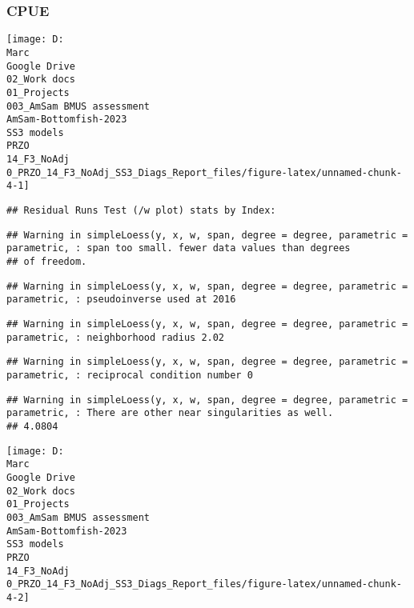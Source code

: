 \documentclass[
]{article}
\begin{document}
\hypertarget{cpue}{%
\subsubsection{CPUE}\label{cpue}}

\begin{center}\texttt{[image: D:\\Marc\\Google Drive\\02\_Work docs\\01\_Projects\\003\_AmSam BMUS assessment\\AmSam-Bottomfish-2023\\SS3 models\\PRZO\\14\_F3\_NoAdj\\0\_PRZO\_14\_F3\_NoAdj\_SS3\_Diags\_Report\_files/figure-latex/unnamed-chunk-4-1]} \end{center}

\begin{verbatim}
## Residual Runs Test (/w plot) stats by Index:
\end{verbatim}

\begin{verbatim}
## Warning in simpleLoess(y, x, w, span, degree = degree, parametric = parametric, : span too small. fewer data values than degrees
## of freedom.
\end{verbatim}

\begin{verbatim}
## Warning in simpleLoess(y, x, w, span, degree = degree, parametric = parametric, : pseudoinverse used at 2016
\end{verbatim}

\begin{verbatim}
## Warning in simpleLoess(y, x, w, span, degree = degree, parametric = parametric, : neighborhood radius 2.02
\end{verbatim}

\begin{verbatim}
## Warning in simpleLoess(y, x, w, span, degree = degree, parametric = parametric, : reciprocal condition number 0
\end{verbatim}

\begin{verbatim}
## Warning in simpleLoess(y, x, w, span, degree = degree, parametric = parametric, : There are other near singularities as well.
## 4.0804
\end{verbatim}

\begin{center}\texttt{[image: D:\\Marc\\Google Drive\\02\_Work docs\\01\_Projects\\003\_AmSam BMUS assessment\\AmSam-Bottomfish-2023\\SS3 models\\PRZO\\14\_F3\_NoAdj\\0\_PRZO\_14\_F3\_NoAdj\_SS3\_Diags\_Report\_files/figure-latex/unnamed-chunk-4-2]} \end{center}
\end{document}
